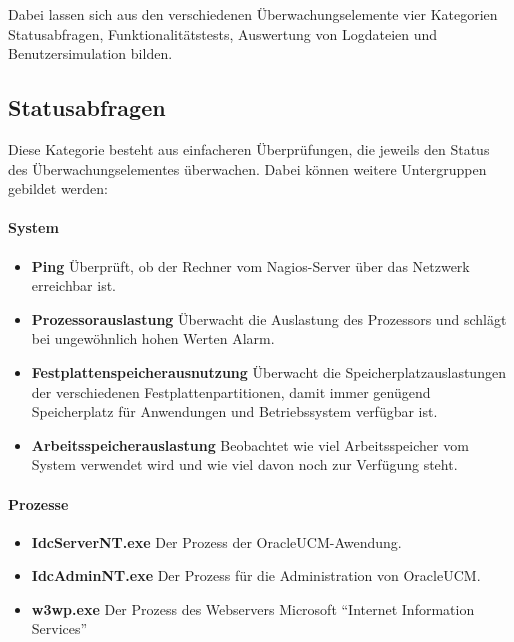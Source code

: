 Dabei lassen sich aus den verschiedenen Überwachungselemente vier Kategorien Statusabfragen, Funktionalitätstests, Auswertung von Logdateien und Benutzersimulation bilden.

\subsection{Statusabfragen}
\label{syschecks}
Diese Kategorie besteht aus einfacheren Überprüfungen, die jeweils den Status des Überwachungselementes überwachen.
Dabei können weitere Untergruppen gebildet werden:

\paragraph{System}
\begin{itemize}
\item \textbf{Ping} Überprüft, ob der Rechner vom Nagios-Server über das Netzwerk erreichbar ist.
\item \textbf{Prozessorauslastung} Überwacht die Auslastung des Prozessors und schlägt bei ungewöhnlich hohen Werten Alarm.
\item \textbf{Festplattenspeicherausnutzung} Überwacht die Speicherplatzauslastungen der verschiedenen Festplattenpartitionen, damit immer genügend Speicherplatz für Anwendungen und Betriebssystem verfügbar ist.
\item \textbf{Arbeitsspeicherauslastung} Beobachtet wie viel Arbeitsspeicher vom System verwendet wird und wie viel davon noch zur Verfügung steht.
\end{itemize}

\paragraph{Prozesse}
\begin{itemize}
\item \textbf{IdcServerNT.exe} Der Prozess der \gls{OracleUCM}-Awendung.
\item \textbf{IdcAdminNT.exe} Der Prozess für die Administration von \gls{OracleUCM}.
\item \textbf{w3wp.exe} Der Prozess des Webservers Microsoft "`Internet Information Services"'
\end{itemize}


